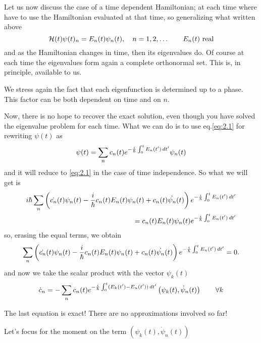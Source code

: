 Let us now discuss the case of a time dependent Hamiltonian; at each time where have to use the Hamiltonian evaluated at that time, so generalizing what written above
\begin{equation}
\mathcal{H}(t) \psi(t)_n=E_n(t)\psi_n(t), \quad n=1,2,\dots \qquad E_n(t) \text{ real} 
\end{equation}
and as the Hamiltonian changes in time, then its eigenvalues do.
Of course at each time the eigenvalues form again a complete orthonormal set. This is, in principle, available to us.
\begin{rem}
	We stress again the fact that each eigenfunction is determined up to a phase. This factor can be both dependent on time and on $ n $.
\end{rem}
Now, there is no hope to recover the exact solution, even though you have solved the eigenvalue problem for each time. What we can do is to use eq.\eqref{eq:2.1} for rewriting $ \psi(t) $ as 
\begin{equation}
\psi(t)=\sum_n c_n(t)e^{-\frac{i}{\hbar}\int_{0}^{t}E_n(t')\mathop{}\!d t'}\psi_n(t)
\label{eq:2.4}
\end{equation}
and it will reduce to \eqref{eq:2.1} in the case of time independence.
So what we will get is
\begin{align}
i\hbar\sum_n\left(\dot{c_n}(t)\psi_n(t)-\frac{i}{\hbar}c_n(t)E_n(t)\psi_n(t)+c_n(t)\dot{\psi_n}(t) \right)e^{-\frac{i}{\hbar}\int_{0}^{t}E_n(t')\mathop{}\!d t'}\\
=c_n(t)E_n(t)\psi_n(t)e^{-\frac{i}{\hbar}\int_{0}^{t}E_n(t')\mathop{}\!d t'}
\end{align}
so, erasing the equal terms, we obtain
\begin{align}
\sum_n\left(\dot{c_n}(t)\psi_n(t)-\frac{i}{\hbar}c_n(t)E_n(t)\psi_n(t)+c_n(t)\dot{\psi_n}(t) \right)e^{-\frac{i}{\hbar}\int_{0}^{t}E_n(t')\mathop{}\!d t'}=0.
\label{eq:2.5}
\end{align}
and now we take the scalar product with the vector $ \psi_k(t) $
\begin{equation}
\dot{c}_n=-\sum_n c_n(t)e^{-\frac{i}{\hbar}\int_{0}^{t}(E_k(t')-E_n(t'))\mathop{}\!d t'} \left(\psi_k(t),\dot{\psi}_n(t) \right) \qquad \forall k 
\end{equation}
\begin{rem}
	The last equation is exact! There are no approximations involved so far!
\end{rem}

Let's focus for the moment on the term $ \left(\psi_k(t),\dot{\psi}_n(t) \right) $

